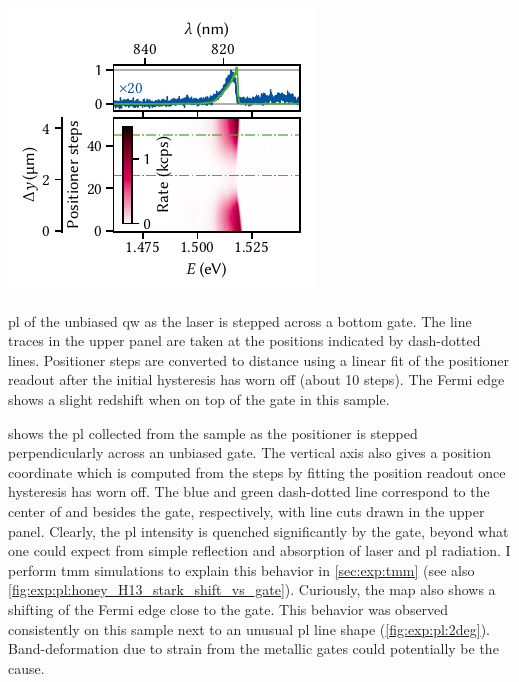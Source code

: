 \begin{marginfigure}
    \centering
    \includegraphics{img/pdf/experiment/fig_F10_positioning}
    \caption[
        $V_{y}=\qty{30}{\volt}$.
        \protect\newline
    ]{
        \Gls{pl} of the unbiased \gls{qw} as the laser is stepped across a bottom gate.
        The line traces in the upper panel are taken at the positions indicated by dash-dotted lines.
        Positioner steps are converted to distance using a linear fit of the positioner readout after the initial hysteresis has worn off (about \num{10} steps).
        The Fermi edge shows a slight redshift when on top of the gate in this sample.
    }
    \label{fig:exp:pl:fig_F10_positioning}
\end{marginfigure}

 shows the \gls{pl} collected from the sample as the positioner is stepped perpendicularly across an unbiased gate.
The vertical axis also gives a position coordinate which is computed from the steps by fitting the position readout once hysteresis has worn off.
The blue and green dash-dotted line correspond to the center of and besides the gate, respectively, with line cuts drawn in the upper panel.
Clearly, the \gls{pl} intensity is quenched significantly by the gate, beyond what one could expect from simple reflection and absorption of laser and \gls{pl} radiation.
I perform \gls{tmm} simulations to explain this behavior in \cref{sec:exp:tmm} (see also \cref{fig:exp:pl:honey_H13_stark_shift_vs_gate}).
Curiously, the map also shows a shifting of the Fermi edge close to the gate.
This behavior was observed consistently on this sample next to an unusual \gls{pl} line shape (\cf \cref{fig:exp:pl:2deg}).
Band-deformation due to strain from the metallic gates could potentially be the cause. %


